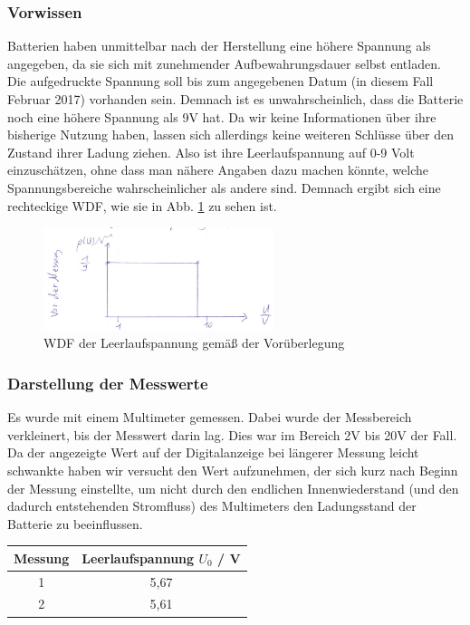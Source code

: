 \documentclass[
	a4paper,
	12pt,
	pagesize,
	ngerman
]{scrartcl}
\begin{document}
	\subsubsection{Vorwissen}
	Batterien haben unmittelbar nach der Herstellung eine höhere Spannung als angegeben, da sie sich mit zunehmender Aufbewahrungsdauer selbst entladen. Die aufgedruckte Spannung soll bis zum angegebenen Datum (in diesem Fall Februar 2017) vorhanden sein. Demnach ist es unwahrscheinlich, dass die Batterie noch eine höhere Spannung als 9V hat. Da wir keine Informationen über ihre bisherige Nutzung haben, lassen sich allerdings keine weiteren Schlüsse über den Zustand ihrer Ladung ziehen. Also ist ihre Leerlaufspannung auf 0-9 Volt einzuschätzen, ohne dass man nähere Angaben dazu machen könnte, welche Spannungsbereiche wahrscheinlicher als andere sind. Demnach ergibt sich eine rechteckige WDF, wie sie in Abb. \ref{WDF} zu sehen ist.
	\begin{figure}[htb]
		\centering
		\includegraphics[width=0.6\textwidth]{WDF} %
		\caption{WDF der Leerlaufspannung gemäß der Vorüberlegung}
		\label{WDF}
	\end{figure}
	\subsubsection{Darstellung der Messwerte}
	Es wurde mit einem Multimeter gemessen. Dabei wurde der Messbereich verkleinert, bis der Messwert darin lag. Dies war im Bereich 2V bis 20V der Fall.  Da der angezeigte Wert auf der Digitalanzeige bei längerer Messung leicht schwankte haben wir versucht den Wert aufzunehmen, der sich kurz nach Beginn der Messung einstellte, um nicht durch den endlichen Innenwiederstand (und den dadurch entstehenden Stromfluss) des Multimeters den Ladungsstand der Batterie zu beeinflussen. %

	\begin{tabular}{| c | c |}
		\hline
		Messung & Leerlaufspannung $U_0$ / \si{V}\\ \hline
		1 & 5,67\\
		2 & 5,61\\ \hline
	\end{tabular}
\end{document}
